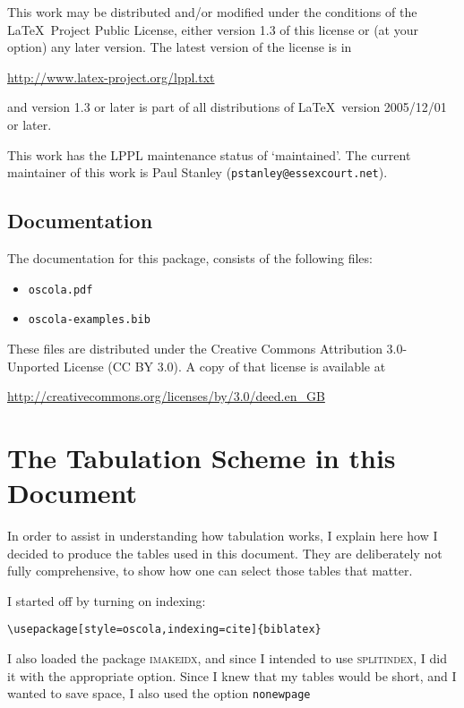 \documentclass[a4paper,
               11pt,
	       DIV=1,			   
	       footinclude=false]
	      {scrartcl}
\begin{document}
This work may be distributed and\slash or modified under the conditions of the \LaTeX\ Project Public License, either version 1.3 of this license or (at your option) any later version. The latest version of the license is in
\begin{center}
\url{http://www.latex-project.org/lppl.txt}
\end{center}
and version 1.3 or later is part of all distributions of \LaTeX\ version 2005\slash 12\slash 01 or later.

This work has the LPPL maintenance status of `maintained'. The current maintainer of this work is Paul Stanley (\texttt{pstanley@essexcourt.net}).

\subsection{Documentation}

The documentation for this package, consists of the following files:
\begin{itemize}
\item \texttt{oscola.pdf}
\item \texttt{oscola-examples.bib}
\end{itemize}

These files are distributed under the Creative Commons Attribution 3.0-Unported License (CC BY 3.0). A copy of that license is available at
\begin{center}
\url{http://creativecommons.org/licenses/by/3.0/deed.en_GB}
\end{center}

\section{The Tabulation Scheme in this Document}

In order to assist in understanding how tabulation works, I explain here how I decided to produce the tables used in this document. They are deliberately not fully comprehensive, to show how one can select those tables that matter.

I started off by turning on indexing:

\begin{verbatim}
\usepackage[style=oscola,indexing=cite]{biblatex}
\end{verbatim}

I also loaded the package \textsc{imakeidx}, and since I intended to use \textsc{splitindex}, I did it with the appropriate option. Since I knew that my tables would be short, and I wanted to save space, I also used the option \verb|nonewpage|
\end{document}
